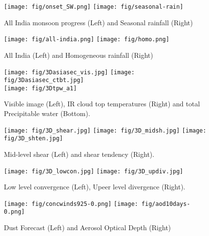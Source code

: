 \documentclass[10pt,a4paper]{article} %
\begin{document}
\begin{figure}[h!]
\centering
\texttt{[image: fig/onset\_SW.png]}
\texttt{[image: fig/seasonal-rain]}
\caption{All India monsoon progress (Left) and Seasonal rainfall (Right)}
\end{figure}



\begin{figure}[h!]
\centering
\texttt{[image: fig/all-india.png]}
\texttt{[image: fig/homo.png]}
\caption{All India  (Left) and Homogeneous rainfall (Right)}
\end{figure}







\begin{figure}[h!]
\centering
\texttt{[image: fig/3Dasiasec\_vis.jpg]}
\texttt{[image: fig/3Dasiasec\_ctbt.jpg]}\\
\texttt{[image: fig/3Dtpw\_a1]}
\caption{Visible image (Left), IR cloud top temperatures (Right) and total Precipitable water (Bottom).}
\end{figure}

\begin{figure}[h!]
\centering
\texttt{[image: fig/3D\_shear.jpg]}
\texttt{[image: fig/3D\_midsh.jpg]}
\texttt{[image: fig/3D\_shten.jpg]}
\caption{Mid-level shear (Left) and shear tendency (Right).}
\end{figure}


\begin{figure}[h!]
\centering
\texttt{[image: fig/3D\_lowcon.jpg]}
\texttt{[image: fig/3D\_updiv.jpg]}

\caption{Low level convergence (Left), Upeer level divergence  (Right).}
\end{figure}



\begin{figure}[h!]
\centering
\texttt{[image: fig/concwinds925-0.png]}
\texttt{[image: fig/aod10days-0.png]}
\caption{Dust Forecast (Left) and Aerosol  Optical Depth (Right)}
\end{figure}
\end{document}
